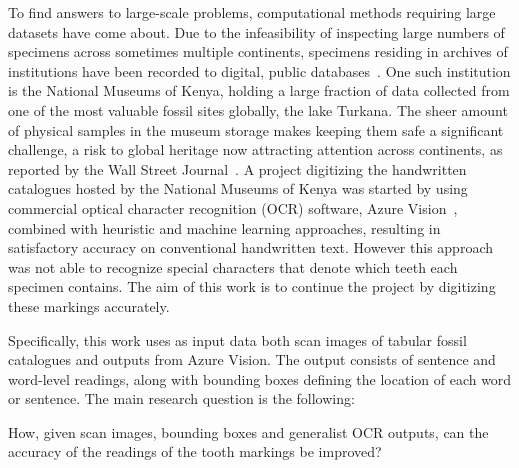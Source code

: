\documentclass[english,twoside,openright]{UH_DS_MSc}
\begin{document}
To find answers to large-scale problems, computational methods requiring large datasets have come about. Due to the infeasibility of inspecting large numbers of specimens across sometimes multiple 
continents, specimens residing in archives of institutions have been recorded to digital, public databases~\cite{uhenCardCatalogsComputers2013}.
One such institution is the National Museums of Kenya, holding a large fraction of data collected from one 
of the most valuable fossil sites globally, the lake Turkana. The sheer amount of physical samples in the museum storage
makes keeping them safe a significant challenge, a risk to global heritage now attracting attention across continents,
 as reported by the Wall Street Journal~\cite{hotzMuseumOverflowingPrehistoric2024}.
 A project digitizing the handwritten catalogues hosted by the National Museums of Kenya was started by
using commercial optical character recognition (OCR) software, Azure Vision~\cite{azurevision}, combined with heuristic and machine learning approaches, 
resulting in satisfactory accuracy on conventional handwritten text. However this 
approach was not able to recognize special characters that denote which teeth each specimen contains. The aim of this work is 
to continue the project by digitizing these markings accurately.


Specifically, this work uses as input data both scan images of tabular fossil catalogues
and outputs from Azure Vision.
The output consists of sentence and word-level readings, along with bounding boxes defining 
the location of each word or sentence. The main research question is the following: 

How, given scan images, bounding boxes and generalist OCR outputs, can the accuracy of the readings of the tooth markings be improved?
\end{document}
